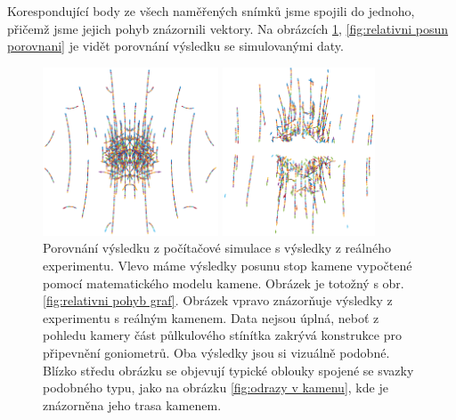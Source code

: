 Korespondující body ze všech naměřených snímků jsme spojili do jednoho, přičemž jsme jejich pohyb znázornili vektory. Na obrázcích \ref{fig:graf posunu porovnani}, \ref{fig:relativni posun porovnani} je vidět porovnání výsledku se simulovanými daty.  

\begin{figure}[h!]
 \begin{center}
 

   \begin{minipage}[c]{0.49\textwidth}
     \centering \includegraphics[height =5cm]{figures/viva12_bigflux} 
   \end{minipage}
   \begin{minipage}[c]{0.49\textwidth}
     \centering \includegraphics[height =5cm]{figures/real_all} 
   \end{minipage}
 \end{center}

   \caption{Porovnání výsledku z počítačové simulace s výsledky z reálného experimentu. Vlevo máme výsledky posunu stop kamene  vypočtené pomocí matematického modelu kamene. Obrázek je totožný s obr. \ref{fig:relativni pohyb graf}. Obrázek vpravo znázorňuje výsledky z experimentu s reálným kamenem. Data nejsou úplná, neboť z pohledu kamery část půlkulového stínítka zakrývá konstrukce pro připevnění goniometrů. Oba výsledky jsou si vizuálně podobné. Blízko středu obrázku se objevují typické oblouky spojené se svazky podobného typu, jako na obrázku \ref{fig:odrazy v kamenu}, kde je znázorněna jeho trasa kamenem.}
   \label{fig:graf posunu porovnani}
 \end{figure}
 
